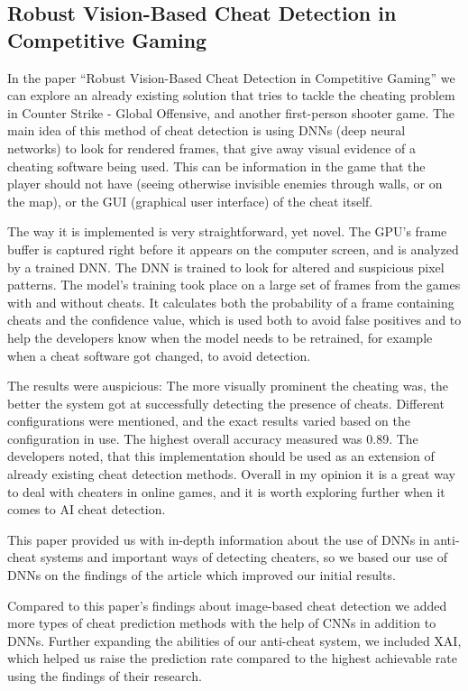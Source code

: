 \subsection{Robust Vision-Based Cheat Detection in Competitive Gaming \cite{jonnalagadda2021robust}}

In the paper “Robust Vision-Based Cheat Detection in Competitive Gaming” we can explore an
already existing solution that tries to tackle the cheating problem in Counter Strike - Global
Offensive, and another first-person shooter game. The main idea of this method of cheat
detection is using DNNs (deep neural networks) to look for rendered frames, that give away
visual evidence of a cheating software being used. This can be information in the game that the
player should not have (seeing otherwise invisible enemies through walls, or on the map), or the
GUI (graphical user interface) of the cheat itself.

The way it is implemented is very straightforward, yet novel. The GPU’s frame buffer is captured
right before it appears on the computer screen, and is analyzed by a trained DNN. The DNN is
trained to look for altered and suspicious pixel patterns. The model's training took place on a
large set of frames from the games with and without cheats. It calculates both the probability of
a frame containing cheats and the confidence value, which is used both to avoid false positives
and to help the developers know when the model needs to be retrained, for example when a
cheat software got changed, to avoid detection.

The results were auspicious: The more visually prominent the cheating was, the better the
system got at successfully detecting the presence of cheats. Different configurations were
mentioned, and the exact results varied based on the configuration in use. The highest overall
accuracy measured was 0.89.
The developers noted, that this implementation should be used as an extension of already
existing cheat detection methods. Overall in my opinion it is a great way to deal with cheaters in
online games, and it is worth exploring further when it comes to AI cheat detection.

This paper provided us with in-depth information about the use of DNNs in anti-cheat systems and important ways of detecting cheaters, so we based our use of DNNs on the findings of the article which improved our initial results.

Compared to this paper's findings about image-based cheat detection we added more types of cheat prediction methods with the help of CNNs in addition to DNNs. Further expanding the abilities of our anti-cheat system, we included XAI, which helped us raise the prediction rate compared to the highest achievable rate using the findings of their research.

